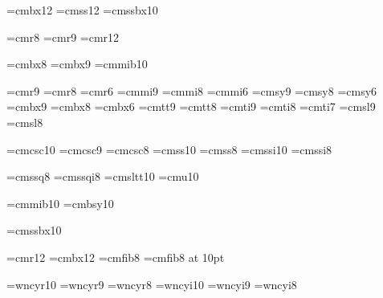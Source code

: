 
\font\bigbold=cmbx12
\font\bigsans=cmss12
\font\smallheader=cmssbx10 %

\font\eightpt=cmr8
\font\ninept=cmr9
\font\twelvept=cmr12

\font\eightbold=cmbx8
\font\ninebold=cmbx9
\font\mathbold=cmmib10

\font\ninerm=cmr9     \font\eightrm=cmr8   \font\sixrm=cmr6      %
\font\ninei=cmmi9     \font\eighti=cmmi8   \font\sixi=cmmi6      %
\font\ninesy=cmsy9    \font\eightsy=cmsy8  \font\sixsy=cmsy6     %
\font\ninebf=cmbx9    \font\eightbf=cmbx8  \font\sixbf=cmbx6     %
\font\ninett=cmtt9    \font\eighttt=cmtt8                        %
\font\nineit=cmti9    \font\eightit=cmti8  \font\sevenit=cmti7   %
\font\ninesl=cmsl9    \font\eightsl=cmsl8                        %

\font\tensc=cmcsc10   \font\ninesc=cmcsc9  \font\eightsc=cmcsc8  %
\font\tenss=cmss10    \font\eightss=cmss8    %
\font\tenssi=cmssi10  \font\eightssi=cmssi8  %

\font\eightssq=cmssq8  \font\eightssqi=cmssqi8  %
\font\tensltt=cmsltt10 %
\font\tenu=cmu10       %

\font\tenbi=cmmib10    %
\font\tenbsy=cmbsy10   %

\font\tenssbx=cmssbx10 %

\font\twelverm=cmr12  \font\twelvebf=cmbx12
\font\eightfib=cmfib8  \font\tenfib=cmfib8 at 10pt
\def\sc{\tensc}  \def\mc{\ninerm}


    \font\tencyr=wncyr10   \font\ninecyr=wncyr9   \font\eightcyr=wncyr8
    \font\tencyri=wncyi10  \font\ninecyri=wncyi9  \font\eightcyri=wncyi8
    \def\cyr{\tencyr\cyracc} \def\cyri{\tencyri\cyracc}

